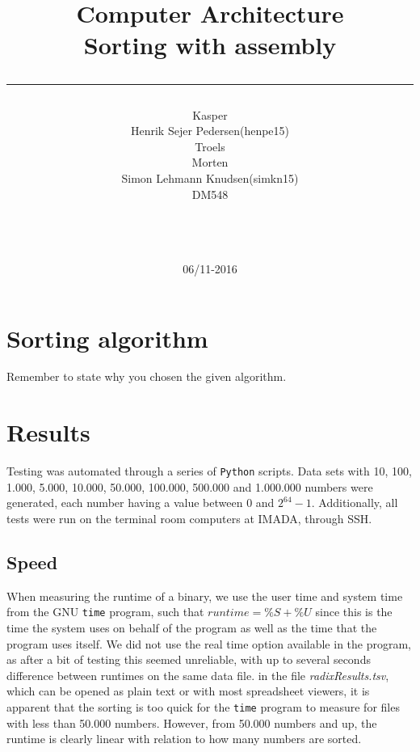 \documentclass[a4paper,10pt]{article}
\title{Computer Architecture \\Sorting with assembly \\\rule{10cm}{0.5mm}}
\author{Kasper\\Henrik Sejer Pedersen(henpe15)\\Troels\\Morten\\Simon Lehmann Knudsen(simkn15)
\\ DM548\\\rule{5.5cm}{0.5mm}\\}
\date{06/11-2016}
\begin{document}
\maketitle

\vfill

\newpage
\tableofcontents

\newpage
\section{Sorting algorithm}
Remember to state why you chosen the given algorithm.

\section{Results}
Testing was automated through a series of \texttt{Python} scripts. Data sets with 10, 100, 1.000, 5.000, 10.000, 50.000, 100.000, 500.000 and 1.000.000 numbers were generated, each number having a value between $0$ and $2^{64} - 1$. \newline
Additionally, all tests were run on the terminal room computers at IMADA, through SSH.
\subsection{Speed}
When measuring the runtime of a binary, we use the user time and system time from the GNU \texttt{time} program, such that $runtime = \%S + \%U$ since this is the time the system uses on behalf of the program as well as the time that the program uses itself. We did not use the real time option available in the program, as after a bit of testing this seemed unreliable, with up to several seconds difference between runtimes on the same data file. \newline
in the file \textit{radixResults.tsv}, which can be opened as plain text or with most spreadsheet viewers, it is apparent that the sorting is too quick for the \texttt{time} program to measure for files with less than 50.000 numbers. However, from 50.000 numbers and up, the runtime is clearly linear with relation to how many numbers are sorted.
\end{document}
